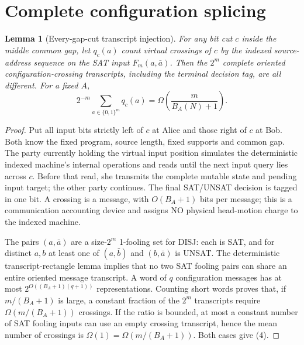 \documentclass[11pt]{article}
\newtheorem{lemma}[theorem]{Lemma}
\begin{document}
\section{Complete configuration splicing}
\begin{lemma}[Every-gap-cut transcript injection]\label{lem:inj}
For any bit cut $c$ inside the middle common gap, let $q_c(a)$ count virtual crossings of $c$ by the indexed source-address sequence on the SAT input $F_m(a,\bar a)$. Then the $2^m$ complete oriented configuration-crossing transcripts, including the terminal decision tag, are all different. For a fixed $A$,
\[
 2^{-m}\sum_{a\in\{0,1\}^m}q_c(a)
  =\Omega\!\left(\frac{m}{B_A(N)+1}\right). \tag{4}
\]
\end{lemma}
\begin{proof}
Put all input bits strictly left of $c$ at Alice and those right of $c$ at Bob. Both know the fixed program, source length, fixed supports and common gap. The party currently holding the virtual input position simulates the deterministic indexed machine's internal operations and reads until the next input query lies across $c$. Before that read, she transmits the complete mutable state and pending input target; the other party continues. The final SAT/UNSAT decision is tagged in one bit. A crossing is a message, with $O(B_A+1)$ bits per message; this is a communication accounting device and assigns NO physical head-motion charge to the indexed machine.

The pairs $(a,\bar a)$ are a size-$2^m$ 1-fooling set for DISJ: each is SAT, and for distinct $a,b$ at least one of $(a,\bar b)$ and $(b,\bar a)$ is UNSAT. The deterministic transcript-rectangle lemma implies that no two SAT fooling pairs can share an entire oriented message transcript. A word of $q$ configuration messages has at most $2^{O((B_A+1)(q+1))}$ representations. Counting short words proves that, if $m/(B_A+1)$ is large, a constant fraction of the $2^m$ transcripts require $\Omega(m/(B_A+1))$ crossings. If the ratio is bounded, at most a constant number of SAT fooling inputs can use an empty crossing transcript, hence the mean number of crossings is $\Omega(1)=\Omega(m/(B_A+1))$. Both cases give (4).
\end{proof}
\end{document}

